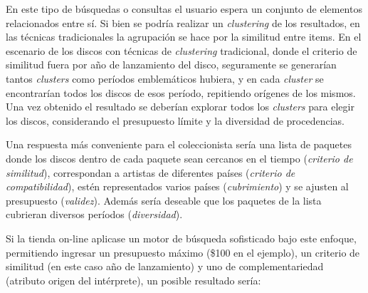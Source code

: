 En este tipo de b\'usquedas o consultas el usuario espera un conjunto de elementos relacionados entre s\'i. Si bien se podr\'ia realizar un {\em clustering} de los resultados, en las t\'ecnicas tradicionales la agrupaci\'on se hace por la similitud entre items. En el escenario de los discos con t\'ecnicas de {\em clustering} tradicional, donde el criterio de similitud fuera por a\~no de lanzamiento del disco, seguramente se generar\'ian tantos {\em clusters} como per\'iodos emblem\'aticos hubiera, y en cada {\em cluster} se encontrar\'ian todos los discos de esos per\'iodo, repitiendo or\'igenes de los mismos. Una vez obtenido el resultado se deber\'ian explorar todos los {\em clusters} para elegir los discos, considerando el presupuesto l\'imite y la diversidad de procedencias.

Una respuesta m\'as conveniente para el coleccionista ser\'ia una lista de paquetes donde los discos dentro de cada paquete sean cercanos en el tiempo ({\em criterio de similitud}), correspondan a artistas de diferentes pa\'ises ({\em criterio de compatibilidad}), est\'en representados varios pa\'ises ({\em cubrimiento}) y se ajusten al presupuesto ({\em validez}). Adem\'as ser\'ia deseable que los paquetes de la lista cubrieran diversos per\'iodos ({\em diversidad}).

Si la tienda on-line aplicase un motor de b\'usqueda sofisticado bajo este enfoque, permitiendo ingresar un presupuesto m\'aximo (\$100 en el ejemplo), un criterio de similitud (en este caso a\~no de lanzamiento) y uno de complementariedad (atributo origen del int\'erprete), un posible resultado ser\'ia:

